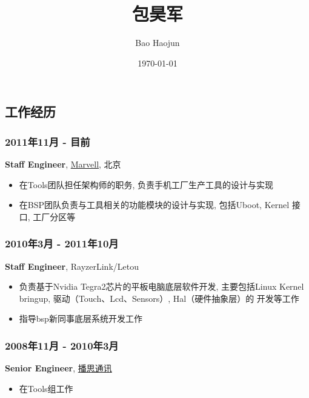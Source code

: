 \documentclass[11pt,dvipdfm,CJKbookmarks]{article}
\author{Bao Haojun}
\date{\today}
\title{包昊军}
\begin{document}

\begin{CJK*}{UTF8}{simsun}


\maketitle



\section{工作经历}
\label{sec-1}
\subsubsection{2011年11月 - 目前}
\label{sec-1-0-1}
\textbf{Staff Engineer}, \href{http://marvell.com}{Marvell}, 北京

\begin{itemize}
\item 在Tools团队担任架构师的职务, 负责手机工厂生产工具的设计与实现

\item 在BSP团队负责与工具相关的功能模块的设计与实现, 包括Uboot, Kernel
接口, 工厂分区等
\end{itemize}
\subsubsection{2010年3月 - 2011年10月}
\label{sec-1-0-2}

\textbf{Staff Engineer}, RayzerLink/Letou

\begin{itemize}
\item 负责基于Nvidia Tegra2芯片的平板电脑底层软件开发, 主要包括Linux
Kernel bringup, 驱动（Touch、Lcd、Sensors）, Hal（硬件抽象层）的
开发等工作

\item 指导bsp新同事底层系统开发工作
\end{itemize}
\subsubsection{2008年11月 - 2010年3月}
\label{sec-1-0-3}

\textbf{Senior Engineer}, \href{http://www.borqs.com}{播思通讯}

\begin{itemize}
\item 在Tools组工作


\end{itemize}
\end{CJK*}
\end{document}
